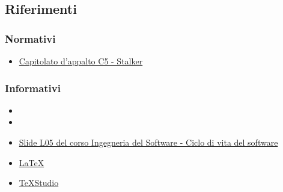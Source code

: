 \subsection{Riferimenti} 
\subsubsection{Normativi}
\begin{itemize}
	\item \href{https://www.math.unipd.it/~tullio/IS-1/2019/Progetto/C5.pdf}{Capitolato d'appalto C5 - Stalker}
\end{itemize}

\subsubsection{Informativi}
\begin{itemize}
	\item {}
	\item {}
	\item \href{https://www.math.unipd.it/~tullio/IS-1/2019/Dispense/L05.pdf}{Slide L05 del corso Ingegneria del Software - Ciclo di vita del software}
	\item \href{https://www.latex-project.org/help/documentation/}{\LaTeX}
	\item \href{https://www.texstudio.org/}{TeXStudio}
\end{itemize}


